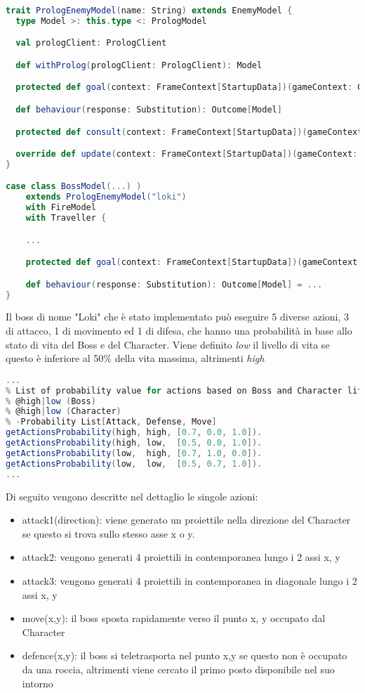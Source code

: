 \begin{lstlisting}[language=Scala]
trait PrologEnemyModel(name: String) extends EnemyModel {
  type Model >: this.type <: PrologModel

  val prologClient: PrologClient

  def withProlog(prologClient: PrologClient): Model

  protected def goal(context: FrameContext[StartupData])(gameContext: GameContext): String

  def behaviour(response: Substitution): Outcome[Model]

  protected def consult(context: FrameContext[StartupData])(gameContext: GameContext): Outcome[Model] = ...

  override def update(context: FrameContext[StartupData])(gameContext: GameContext): Outcome[Model] = ...
}

case class BossModel(...) ) 
	extends PrologEnemyModel("loki")
	with FireModel
	with Traveller {

	...

	protected def goal(context: FrameContext[StartupData])(gameContext: GameContext): String = ...

	def behaviour(response: Substitution): Outcome[Model] = ...
}
\end{lstlisting}

Il boss di nome "Loki" che è stato implementato può eseguire 5 diverse azioni, 3 di attacco, 1 di movimento ed 1 di difesa,
che hanno una probabilità in base allo stato di vita del Boss e del Character. 
Viene definito \textit{low} il livello di vita se questo è inferiore al 50\% della vita massima, altrimenti \textit{high}

\begin{lstlisting}[language=Scala]
% estratto del file prolog "assets/prolog/loki.pl"
... 
% List of probability value for actions based on Boss and Character life level
% @high|low (Boss)
% @high|low (Character)
% -Probability List[Attack, Defense, Move]
getActionsProbability(high, high, [0.7, 0.0, 1.0]).
getActionsProbability(high, low,  [0.5, 0.0, 1.0]).
getActionsProbability(low,  high, [0.7, 1.0, 0.0]).
getActionsProbability(low,  low,  [0.5, 0.7, 1.0]).
...
\end{lstlisting}

Di seguito vengono descritte nel dettaglio le singole azioni:
\begin{itemize}
	\item attack1(direction): viene generato un proiettile nella direzione del Character se questo si trova sullo stesso asse x o y.
	\item attack2: vengono generati 4 proiettili in contemporanea lungo i 2 assi x, y
	\item attack3: vengono generati 4 proiettili in contemporanea in diagonale lungo i 2 assi x, y
	\item move(x,y): il boss sposta rapidamente verso il punto x, y occupato dal Character
	\item defence(x,y): il boss si teletrasporta nel punto x,y se questo non è occupato da una roccia, altrimenti viene cercato il primo posto disponibile nel suo intorno
\end{itemize}